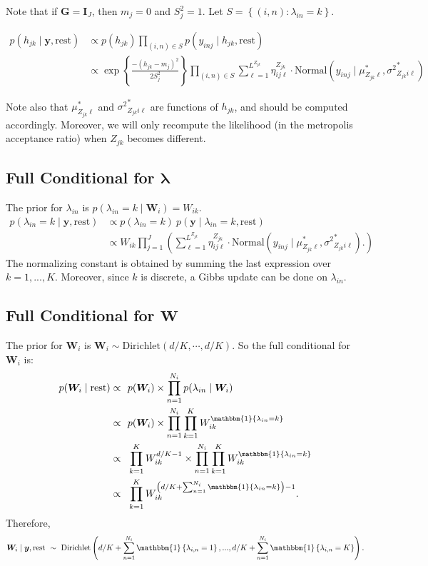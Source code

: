 \documentclass[12pt]{article}
\newcommand{\p}[1]{\left(#1\right)}
\newcommand{\bc}[1]{ \left\{#1\right\} }
\newcommand{\N}{ \mathcal{N} }
\newcommand{\I}{\mathrm{\mathbf{I}}}
\def\N{\text{Normal}}
\def\Dir{\text{Dirichlet}}
\def\lin{\lambda_{in}}
\def\y{\bm{y}}
\def\mus{\mu^*}
\def\sss{{\sigma^2}^*}
\newcommand{\Ind}[1]{\mathbbm{1}\bc{#1}}
\def\rest{\text{rest}}
\begin{document}
Note that if $\bm G = \I_J$, then $m_j=0$ and $S_j^2 = 1$. Let
$S = \bc{(i,n)\colon \lin=k}$.

\begin{align*}
p(h_{jk} \mid \y, \rest)  &\propto p(h_{jk}) \prod_{(i,n) \in S} p(y_{inj} \mid h_{jk}, \rest) \\
%
&\propto
\exp\bc{\frac{-(h_{jk} - m_j)^2}{2S_j^2}}
\prod_{(i,n)\in S}
\sum_{\ell=1}^{L^{Z_{jk}}} \eta^{Z_{jk}}_{ij\ell} \cdot
\N(y_{inj} \mid \mus_{Z_{jk}\ell}, \sss_{Z_{jk}i\ell})
\end{align*}


Note also that $\mus_{Z_{jk}\ell}$ and $\sss_{Z_{jk}i\ell}$ are
functions of $h_{jk}$, and should be computed accordingly. Moreover,
we will only recompute the likelihood (in the metropolis acceptance
ratio) when $Z_{jk}$ becomes different.

\subsection{\texorpdfstring{Full Conditional for
$\bm \lambda$}{Full Conditional for \textbackslash{}bm \textbackslash{}lambda}}\label{full-conditional-for-bm-lambda}

The prior for $\lin$ is $p(\lin = k \mid \bm W_i) = W_{ik}$.
%
\begin{align*}
p(\lin=k\mid \y,\rest) &\propto p(\lin=k) ~ p(\y \mid \lin=k, \rest) \\
&\propto W_{ik}
\prod_{j=1}^J 
\p{
  \sum_{\ell=1}^{L^{Z_{jk}}} \eta^{Z_{jk}}_{ij\ell} \cdot
  \N(y_{inj} \mid 
  \mus_{Z_{jk}\ell}, \sss_{Z_{jk}i\ell}).
}
\end{align*}
%
The normalizing constant is obtained by summing the last expression over
$k = 1,...,K$. Moreover, since $k$ is discrete, a Gibbs update can
be done on $\lin$.

\subsection{\texorpdfstring{Full Conditional for
$\bm W$}{Full Conditional for \textbackslash{}bm W}}\label{full-conditional-for-bm-w}

The prior for $\bm{W}_i$ is $\bm W_i \sim \Dir(d/K, \cdots, d/K)$. So
the full conditional for $\bm{W}_i$ is:
%
\begin{align*}
p(\bm W_i \mid \rest) \propto&~~ p(\bm{W}_i) \times \prod_{n=1}^{N_i} p(\lin \mid \bm{W}_i)\\
\propto&~~ p(\bm{W}_i) \times \prod_{n=1}^{N_i}\prod_{k=1}^K W_{ik}^{\Ind{\lin=k}}\\
\propto&~~ \prod_{k=1}^K W_{ik}^{d/K-1} \times \prod_{n=1}^{N_i}\prod_{k=1}^K W_{ik}^{\Ind{\lin=k}}\\
\propto&~~ \prod_{k=1}^K W_{ik}^{\p{d/K + \sum_{n=1}^{N_i}\Ind{\lin=k}}-1}.
%
\end{align*}
%
Therefore, $$
\bm{W}_i \mid \y,\rest ~\sim~ \Dir\p{d/K+\sum_{n=1}^{N_i}\Ind{\lambda_{i,n}=1},...,d/K+\sum_{n=1}^{N_i}\Ind{\lambda_{i,n}=K}}. 
$$
\end{document}
